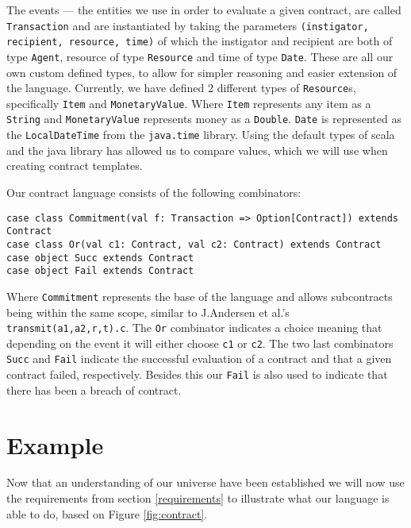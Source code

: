 \documentclass{ituthesis}
\begin{document}
The events --- the entities we use in order to evaluate a given contract, are called \texttt{Transaction} and are instantiated by taking the parameters \texttt{(instigator, recipient, resource, time)} of which the instigator and recipient are both of type \texttt{Agent}, resource of type \texttt{Resource} and time of type \texttt{Date}. These are all our own custom defined types, to allow for simpler reasoning and easier extension of the language. Currently, we have defined 2 different types of \texttt{Resource}s, specifically \texttt{Item} and \texttt{MonetaryValue}. Where \texttt{Item} represents any item as a \texttt{String} and \texttt{MonetaryValue} represents money as a \texttt{Double}. \texttt{Date} is represented as the \texttt{LocalDateTime} from the \texttt{java.time} library. Using the default types of scala and the java library has allowed us to compare values, which we will use when creating contract templates.

Our contract language consists of the following combinators:
\begin{lstlisting}
case class Commitment(val f: Transaction => Option[Contract]) extends Contract
case class Or(val c1: Contract, val c2: Contract) extends Contract
case object Succ extends Contract
case object Fail extends Contract
\end{lstlisting}

Where \texttt{Commitment} represents the base of the language and allows subcontracts being within the same scope, similar to J.Andersen et al.'s \texttt{transmit(a1,a2,r,t).c}. The \texttt{Or} combinator indicates a choice meaning that depending on the event it will either choose \texttt{c1} or \texttt{c2}. The two last combinators \texttt{Succ} and \texttt{Fail} indicate the successful evaluation of a contract and that a given contract failed, respectively. Besides this our \texttt{Fail} is also used to indicate that there has been a breach of contract.

\section{Example}

Now that an understanding of our universe have been established we will now use the requirements from section \ref{requirements} to illustrate what our language is able to do, based on Figure \ref{fig:contract}.
\end{document}
